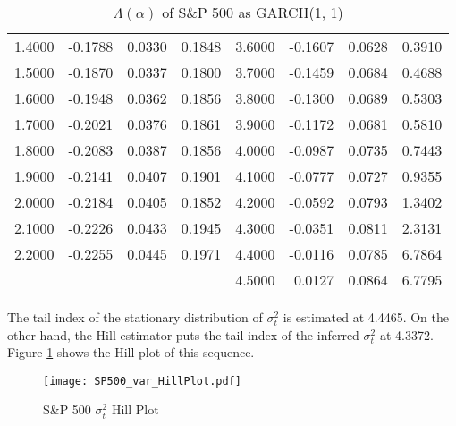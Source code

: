 \documentclass{article}
\theoremstyle{remark}
\begin{document}
\begin{itemize}
\begin{table}[htb!]
\begin{tabular}{r|r|r|r||r|r|r|r}
      1.4000 & -0.1788 & 0.0330 & 0.1848 & 3.6000 & -0.1607 & 0.0628 & 0.3910\\
      1.5000 & -0.1870 & 0.0337 & 0.1800 & 3.7000 & -0.1459 & 0.0684 & 0.4688\\
      1.6000 & -0.1948 & 0.0362 & 0.1856 & 3.8000 & -0.1300 & 0.0689 & 0.5303\\
      1.7000 & -0.2021 & 0.0376 & 0.1861 & 3.9000 & -0.1172 & 0.0681 & 0.5810\\
      1.8000 & -0.2083 & 0.0387 & 0.1856 & 4.0000 & -0.0987 & 0.0735 & 0.7443\\
      1.9000 & -0.2141 & 0.0407 & 0.1901 & 4.1000 & -0.0777 & 0.0727 & 0.9355\\
      2.0000 & -0.2184 & 0.0405 & 0.1852 & 4.2000 & -0.0592 & 0.0793 & 1.3402\\
      2.1000 & -0.2226 & 0.0433 & 0.1945 & 4.3000 & -0.0351 & 0.0811 & 2.3131\\
      2.2000 & -0.2255 & 0.0445 & 0.1971 & 4.4000 & -0.0116 & 0.0785 & 6.7864\\
      & & & & 4.5000 &  0.0127 & 0.0864 & 6.7795
    \end{tabular}
    \caption{$\Lambda(\alpha)$ of S\&P 500 as GARCH(1, 1)}
    \label{tab:sp500_garch11_Lambda}
  \end{table}
  The tail index of the stationary distribution of $\sigma_t^2$ is
  estimated at 4.4465. On the other hand, the Hill estimator puts the
  tail index of the inferred $\sigma_t^2$ at 4.3372. Figure
  \ref{fig:SP500_var_HillPlot} shows the Hill plot of this sequence.
  \begin{figure}[htb!]
    \centering
    \texttt{[image: SP500\_var\_HillPlot.pdf]}
    \caption{S\&P 500 $\sigma_t^2$ Hill Plot}
    \label{fig:SP500_var_HillPlot}
  \end{figure}


\end{itemize}
\end{document}
